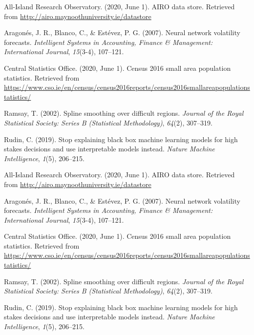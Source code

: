 \documentclass[]{article}
\newlength{\cslhangindent}
\newenvironment{cslreferences}%
  {\setlength{\parindent}{0pt}%
  \everypar{\setlength{\hangindent}{\cslhangindent}}\ignorespaces}%
  {\par}
\begin{document}
\hypertarget{refs}{}
\begin{cslreferences}
\leavevmode\hypertarget{ref-airo2020}{}%
All-Island Research Observatory. (2020, June 1). AIRO data store. Retrieved from \url{http://airo.maynoothuniversity.ie/datastore}

\leavevmode\hypertarget{ref-aragones2007neural}{}%
Aragonés, J. R., Blanco, C., \& Estévez, P. G. (2007). Neural network volatility forecasts. \emph{Intelligent Systems in Accounting, Finance \& Management: International Journal}, \emph{15}(3-4), 107--121.

\leavevmode\hypertarget{ref-cso2020}{}%
Central Statistics Office. (2020, June 1). Census 2016 small area population statistics. Retrieved from \url{https://www.cso.ie/en/census/census2016reports/census2016smallareapopulationstatistics/}

\leavevmode\hypertarget{ref-ramsay2002spline}{}%
Ramsay, T. (2002). Spline smoothing over difficult regions. \emph{Journal of the Royal Statistical Society: Series B (Statistical Methodology)}, \emph{64}(2), 307--319.

\leavevmode\hypertarget{ref-rudin2019stop}{}%
Rudin, C. (2019). Stop explaining black box machine learning models for high stakes decisions and use interpretable models instead. \emph{Nature Machine Intelligence}, \emph{1}(5), 206--215.

\leavevmode\hypertarget{ref-airo2020}{}%
All-Island Research Observatory. (2020, June 1). AIRO data store. Retrieved from \url{http://airo.maynoothuniversity.ie/datastore}

\leavevmode\hypertarget{ref-aragones2007neural}{}%
Aragonés, J. R., Blanco, C., \& Estévez, P. G. (2007). Neural network volatility forecasts. \emph{Intelligent Systems in Accounting, Finance \& Management: International Journal}, \emph{15}(3-4), 107--121.

\leavevmode\hypertarget{ref-cso2020}{}%
Central Statistics Office. (2020, June 1). Census 2016 small area population statistics. Retrieved from \url{https://www.cso.ie/en/census/census2016reports/census2016smallareapopulationstatistics/}

\leavevmode\hypertarget{ref-ramsay2002spline}{}%
Ramsay, T. (2002). Spline smoothing over difficult regions. \emph{Journal of the Royal Statistical Society: Series B (Statistical Methodology)}, \emph{64}(2), 307--319.

\leavevmode\hypertarget{ref-rudin2019stop}{}%
Rudin, C. (2019). Stop explaining black box machine learning models for high stakes decisions and use interpretable models instead. \emph{Nature Machine Intelligence}, \emph{1}(5), 206--215.
\end{cslreferences}
\end{document}
